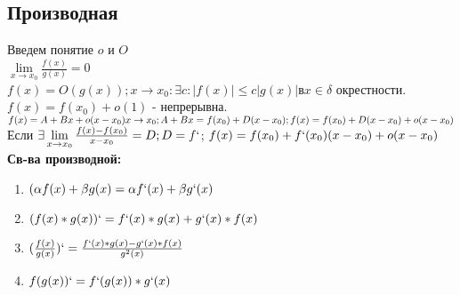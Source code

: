 \documentclass{article}
\begin{document}
\subsection{Производная}
Введем понятие $o$ и $O$\\
$\lim\limits_{x \to x_0} \frac{f(x)}{g(x)} = 0$\\
$f(x) = O(g(x)); x \to x_0: \exists c: |f(x)|\leq c|g(x)| в x \in \delta$ окрестности.\\
$f(x) = f(x_0)+o(1)$ - непрерывна.\\
$f(x) = A+Bx+o(x-x_0) x \to x_0;\\
A+Bx = f(x_0)+D(x-x_0); f(x) = f(x_0)+D(x-x_0)+o(x-x_0)$\\
Если $\exists \lim\limits_{x \to x_0} \frac{f(x)-f(x_0)}{x-x_0} = D; D = f`$;
$f(x) = f(x_0)+f`(x_0)(x-x_0)+o(x-x_0)$\\
\textbf{Св-ва производной:}\\
\begin{enumerate}
\item $(\alpha f(x)+ \beta g(x) = \alpha f`(x) + \beta g`(x)$
\item $(f(x)*g(x))`=f`(x)*g(x)+g`(x)*f(x)$
\item $(\frac{f(x)}{g(x)})`=\frac{f`(x)*g(x)-g`(x)*f(x)}{g^2(x)}$
\item $f(g(x))`=f`(g(x))*g`(x)$
\end{enumerate}
\end{document}
